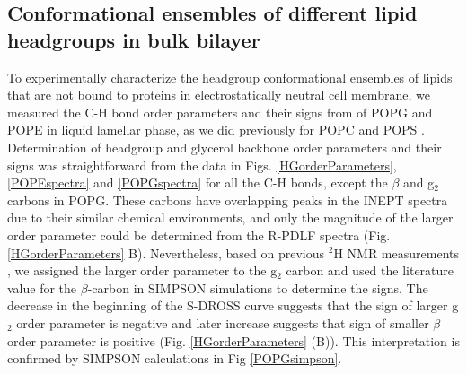 \documentclass[aps,prl,superscriptaddress,twocolumn]{revtex4}
\begin{document}
\subsection{Conformational ensembles of different lipid headgroups in bulk bilayer}

To experimentally characterize the headgroup conformational ensembles of lipids
that are not bound to proteins in electrostatically neutral cell membrane,
we measured the C-H bond order parameters and their signs from of POPG and POPE
in liquid lamellar phase, as we did previously for POPC and POPS \cite{ferreira13,ferreira16,antila19}.
Determination of headgroup and glycerol backbone order parameters and their signs
was straightforward from the
data in Figs. \ref{HGorderParameters}, \ref{POPEspectra} and \ref{POPGspectra}
for all the C-H bonds, except the $\beta$ and g$_2$ carbons in POPG.
These carbons have overlapping peaks in the INEPT spectra due to their similar chemical environments,
and only the magnitude of the larger order parameter could be determined from the R-PDLF spectra (Fig. \ref{HGorderParameters} B).
Nevertheless, based on previous $^2$H NMR measurements \cite{wohlgemuth80,gally81,borle85},
we assigned the larger order parameter to the g$_2$ carbon
and used the literature value for the $\beta$-carbon in SIMPSON simulations to determine the signs.
The decrease in the beginning of the S-DROSS curve suggests that the sign of larger g$_2$ order parameter
is negative and later increase suggests that sign of smaller $\beta$ order parameter is positive (Fig. \ref{HGorderParameters} (B)).
This interpretation is confirmed by SIMPSON calculations in Fig \ref{POPGsimpson}.


\end{document}
